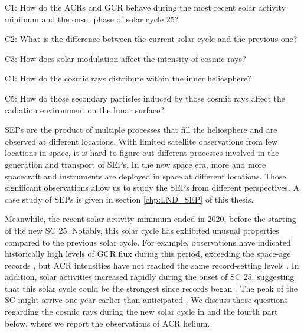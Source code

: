 
\begin{tcolorbox}[colback=blue!5!white,colframe=blue!75!black,title=Scientific questions - cosmic rays]
    C1: How do the \acp{ACR} and \ac{GCR} behave during the most recent solar activity minimum and the onset phase of solar cycle 25? \\ \hfill

    C2: What is the difference between the current solar cycle and the previous one?\\ 
    \hfill

    C3: How does solar modulation affect the intensity of cosmic rays?  \\
    \hfill

    C4: How do the cosmic rays distribute within the inner heliosphere?  \\
    \hfill

C5: How do those secondary particles induced by those cosmic rays affect the radiation environment on the lunar surface?
\end{tcolorbox}
    

\acp{SEP} are the product of multiple processes that fill the heliosphere and are observed at different locations. With limited satellite observations from few locations in space, it is hard to figure out different processes involved in the generation and transport of \acp{SEP}. In the new space era, more and more spacecraft and instruments are deployed in space at different locations. Those significant observations allow us to study the \acp{SEP} from different perspectives. A case study of \acp{SEP} is given in section \ref{chp:LND_SEP} of this thesis.

Meanwhile, the recent solar activity minimum ended in 2020, before the starting of the new \ac{SC} 25. Notably, this solar cycle has exhibited unusual properties compared to the previous solar cycle. For example, observations have indicated historically high levels of \ac{GCR} flux during this period, exceeding the space-age records \citep{Fu2021ApJS, Xu2022FrASS}, but \ac{ACR} intensities have not reached the same record-setting levels \citep{Strauss2023ApJ}. 
In addition, solar activities increased rapidly during the onset of \ac{SC} 25, suggesting that this solar cycle could be the strongest since records began \citep{Nagovitsyn2023SoPh}. The peak of the \ac{SC} might arrive one year earlier than anticipated \citep{Prasad2023SoPh,McIntosh2020SoPh}. 
We discuss those questions regarding the cosmic rays during the new solar cycle in \citet{Xu2022FrASS,Mason-2021-SolOQuietTime} and the fourth part below, where we report the observations of \ac{ACR} helium.



